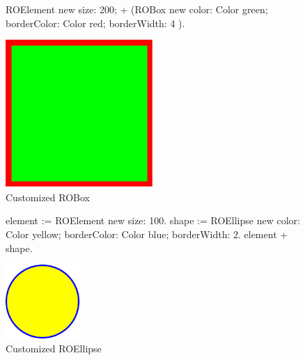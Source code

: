 \documentclass[a4paper,10pt,twoside]{book}
\begin{document}
\begin{figure}[H]
      \begin{minipage}[t]{0.5\textwidth}
      \vspace{0pt}
     \begin{code}{}
ROElement new 
	size: 200; 
	+ (ROBox new 
				color: Color green; 
				borderColor: Color red; 
				borderWidth: 4 ).	\end{code}
   \end{minipage}
   \hfill
   \begin{minipage}[t]{0.4\textwidth}
      \vspace{0pt} \raggedright
       \centering
		\includegraphics[width=0.5\textwidth]{box}
   \end{minipage}
\caption{Customized ROBox}
\label{fig:box}
\end{figure} 

\begin{figure}[H]
      \begin{minipage}[t]{0.6\textwidth}
      \vspace{0pt}
     \begin{code}{}
element := ROElement new size: 100.
shape := ROEllipse new 
			color: Color yellow; 
			borderColor: Color blue; 
			borderWidth: 2.
element + shape.	\end{code}
   \end{minipage}
   \hfill
   \begin{minipage}[t]{0.4\textwidth}
      \vspace{0pt} \raggedright
       \centering
		\includegraphics[width=0.25\textwidth]{circle}     
   \end{minipage}
\caption{Customized ROEllipse}
\label{fig:circle}
\end{figure}
\end{document}
